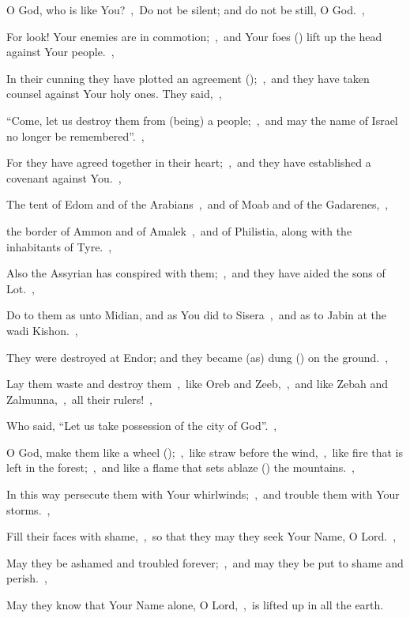 \documentclass[12pt,twoside,a5paper]{article}
\begin{document}
\begin{normalparskip}
  O God, who is like You?~\sep\ Do not be silent; and do not be still, O God.~\sep


  For look! Your enemies are in commotion;~\sep\ and Your foes () lift up the head against Your people.~\sep

  In their cunning they have plotted an agreement ();~\sep\ and they have taken counsel against Your holy ones. They said,~\sep

  ``Come, let us destroy them from (being) a people;~\sep\ and may the name of Israel no longer be remembered''.~\sep

  For they have agreed together in their heart;~\sep\ and they have established a covenant against You.~\sep

  The tent of Edom and of the Arabians~\sep\ and of Moab and of the Gadarenes,~\sep

  the border of Ammon and of Amalek~\sep\ and of Philistia, along with the inhabitants of Tyre.~\sep

  Also the Assyrian has conspired with them;~\sep\ and they have aided the sons of Lot.~\sep

  Do to them as unto Midian, and as You did to Sisera~\sep\ and as to Jabin at the wadi Kishon.~\sep

  They were destroyed at Endor; and they became (as) dung () on the ground.~\sep

  Lay them waste and destroy them~\sep\ like Oreb and Zeeb,~\sep\ and like Zebah and Zalmunna,~\sep\ all their rulers!~\sep

  Who said, ``Let us take possession of the city of God''.~\sep

  O God, make them like a wheel ();~\sep\ like straw before the wind,~\sep\ like fire that is left in the forest;~\sep\ and like a flame that sets ablaze () the mountains.~\sep

  In this way persecute them with Your whirlwinds;~\sep\ and trouble them with Your storms.~\sep

  Fill their faces with shame,~\sep\ so that they may they seek Your Name, O Lord.~\sep

  May they be ashamed and troubled forever;~\sep\ and may they be put to shame and perish.~\sep

  May they know that Your Name alone, O Lord,~\sep\ is lifted up in all the earth.
\end{normalparskip}
\end{document}

